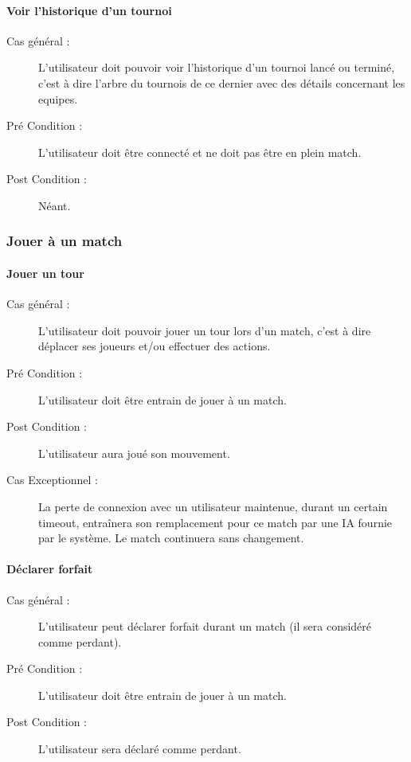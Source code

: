 \documentclass[a4paper]{article}
\begin{document}
\paragraph{Voir l'historique d'un tournoi}
\begin{description}
    \item[Cas général :] L'\gls{utilisateur} doit pouvoir voir l'historique d'un tournoi lancé ou terminé, c'est à dire l'arbre du tournois de ce dernier avec des détails concernant les \glspl{equipe}.
    \item[Pré Condition  :] L'\gls{utilisateur} doit être connecté et ne doit pas être en plein match.
    \item[Post Condition :] Néant.
\end{description}

\subsubsection{Jouer à un match}
\paragraph{Jouer un tour}
\begin{description}
    \item[Cas général :] L'\gls{utilisateur} doit pouvoir jouer un tour lors d'un match, c'est à dire déplacer ses \glspl{joueur} et/ou effectuer des actions.
    \item[Pré Condition  :] L'\gls{utilisateur} doit être entrain de jouer à un match.
    \item[Post Condition :] L'\gls{utilisateur} aura joué son mouvement.
    \item[Cas Exceptionnel :] La perte de connexion avec un \gls{utilisateur} maintenue, durant un certain timeout, entraînera son remplacement pour ce match par une IA fournie par le système. Le match continuera sans changement.
\end{description}
\paragraph{Déclarer forfait}
\begin{description}
\item[Cas général :] L'\gls{utilisateur} peut déclarer forfait durant un match (il sera considéré comme perdant).
\item[Pré Condition  :] L'\gls{utilisateur} doit être entrain de jouer à un match.
\item[Post Condition :] L'\gls{utilisateur} sera déclaré comme perdant.
\end{description}
\end{document}
